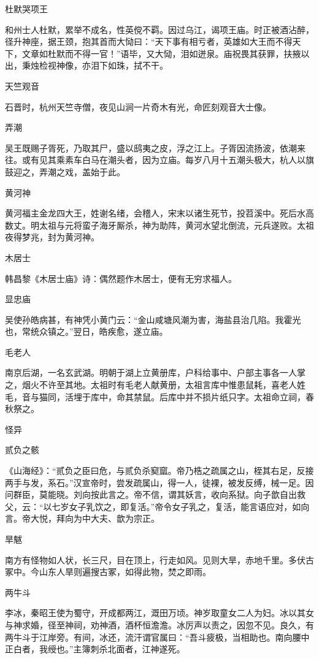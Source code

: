 \documentclass[a4paper,12pt,UTF8,twoside]{ctexbook}
\begin{document}
    杜默哭项王
    
    和州士人杜默，累举不成名，性英傥不羁。因过乌江，谒项王庙。时正被酒沾醉，径升神座，据王颈，抱其首而大恸曰：“天下事有相亏者，英雄如大王而不得天下，文章如杜默而不得一官！”语毕，又大恸，泪如迸泉。庙祝畏其获罪，扶掖以出，秉烛检视神像，亦泪下如珠，拭不干。
    
    天竺观音
    
    石晋时，杭州天竺寺僧，夜见山涧一片奇木有光，命匠刻观音大士像。
    
    弄潮
    
    吴王既赐子胥死，乃取其尸，盛以鸱夷之皮，浮之江上。子胥因流扬波，依潮来往。或有见其乘素车白马在潮头者，因为立庙。每岁八月十五潮头极大，杭人以旗鼓迎之，弄潮之戏，盖始于此。
    
    黄河神
    
    黄河福主金龙四大王，姓谢名绪，会稽人，宋末以诸生死节，投苕溪中。死后水高数丈。明太祖与元将蛮子海牙厮杀，神为助阵，黄河水望北倒流，元兵遂败。太祖夜得梦兆，封为黄河神。
    
    木居士
    
    韩昌黎《木居士庙》诗：偶然题作木居士，便有无穷求福人。
    
    显忠庙
    
    吴使孙皓病甚，有神凭小黄门云：“金山咸塘风潮为害，海盐县治几陷。我霍光也，常统众镇之。”翌日，皓疾愈，遂立庙。
    
    毛老人
    
    南京后湖，一名玄武湖。明朝于湖上立黄册库，户科给事中、户部主事各一人掌之，烟火不许至其地。太祖时有毛老人献黄册，太祖言库中惟患鼠耗，喜老人姓毛，音与猫同，活埋于库中，命其禁鼠。后库中并不损片纸只字。太祖命立祠，春秋祭之。
    
    怪异 
    
    贰负之骸
    
    《山海经》：“贰负之臣曰危，与贰负杀窫窳。帝乃梏之疏属之山，桎其右足，反接两手与发，系石。”汉宣帝时，尝发疏属山，得一人，徒裸，被发反缚，械一足。因问群臣，莫能晓。刘向按此言之。帝不信，谓其妖言，收向系狱。向子歆自出救父，云：“以七岁女子乳饮之，即复活。”帝令女子乳之，复活，能言语应对，如向言。帝大悦，拜向为中大夫、歆为宗正。
    
    旱魃
    
    南方有怪物如人状，长三尺，目在顶上，行走如风。见则大旱，赤地千里。多伏古冢中。今山东人旱则遍搜古冢，如得此物，焚之即雨。
    
    两牛斗
    
    李冰，秦昭王使为蜀守，开成都两江，溉田万顷。神岁取童女二人为妇。冰以其女与神求婚，径至神祠，劝神酒，酒杯恒澹澹。冰厉声以责之，因忽不见。良久，有两牛斗于江岸旁。有间，冰还，流汗谓官属曰：“吾斗疲极，当相助也。南向腰中正白者，我绶也。”主簿刺杀北面者，江神遂死。
    
\end{document}
